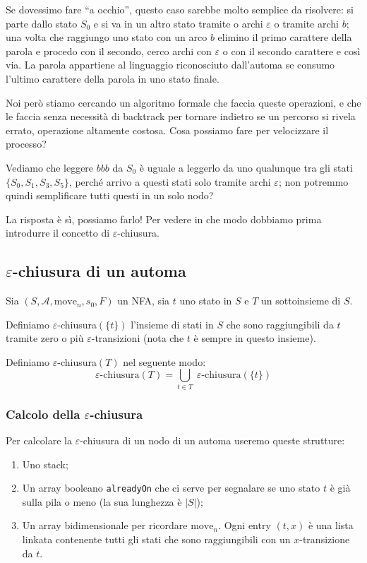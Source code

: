 \documentclass[class=book, crop=false, oneside, 12pt]{standalone}
\begin{document}
Se dovessimo fare “a occhio”, questo caso sarebbe molto semplice da risolvere: si parte dallo stato \(S_0\) e si va in un altro stato tramite o archi \(\varepsilon\) o tramite archi \(b\); una volta che raggiungo uno stato con un arco \(b\) elimino il primo carattere della parola e procedo con il secondo, cerco archi con \(\varepsilon\) o con il secondo carattere e così via.
La parola appartiene al linguaggio riconosciuto dall’automa se consumo l’ultimo carattere della parola in uno stato finale.

Noi però stiamo cercando un algoritmo formale che faccia queste operazioni, e che le faccia senza necessità di backtrack per tornare indietro se un percorso si rivela errato, operazione altamente costosa.
Cosa possiamo fare per velocizzare il processo?

Vediamo che leggere \(bbb\) da \(S_0\) è uguale a leggerlo da uno qualunque tra gli stati \(\{S_0, S_1, S_3, S_5\}\), perché arrivo a questi stati solo tramite archi \(\varepsilon\); non potremmo quindi semplificare tutti questi in un solo nodo?

La risposta è sì, possiamo farlo! Per vedere in che modo dobbiamo prima introdurre il concetto di \(\varepsilon\)-chiusura.


\subsection{\(\varepsilon\)-chiusura di un automa}
Sia \((S, \mathcal{A}, \textrm{move}_n, s_0, F)\) un NFA, sia \(t\) uno stato in \(S\) e \(T\) un sottoinsieme di \(S\).

Definiamo \(\varepsilon\)-chiusura\((\{t\})\) l’insieme di stati in \(S\) che sono raggiungibili da \(t\) tramite zero o più \(\varepsilon\)-transizioni (nota che \(t\) è sempre in questo insieme).

Definiamo \(\varepsilon\)-chiusura\((T)\) nel seguente modo:
\begin{equation}
    \varepsilon \textrm{-chiusura}(T) = \bigcup_{t \in T} \;\varepsilon\textrm{-chiusura}(\{t\})
\end{equation} 

\subsubsection{Calcolo della \(\varepsilon\)-chiusura}
Per calcolare la \(\varepsilon\)-chiusura di un nodo di un automa useremo queste strutture:

\begin{enumerate}
    \item Uno stack;
    \item Un array booleano \texttt{alreadyOn} che ci serve per segnalare se uno stato \(t\) è già sulla pila o meno (la sua lunghezza è \(|S|\));
    \item Un array bidimensionale per ricordare \(\textrm{move}_n\). Ogni entry \((t,x)\) è una lista linkata contenente tutti gli stati che sono raggiungibili con un \(x\)-transizione da \(t\).
\end{enumerate}
\end{document}
